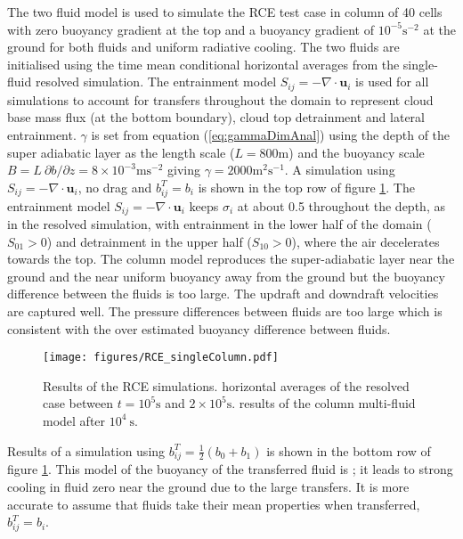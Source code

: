 \documentclass[draft]{agujournal2019}
\begin{document}
The two fluid model is used to simulate the RCE test case in 
column of 40 cells with zero buoyancy gradient at the top and a buoyancy
gradient of $10^{-5}\text{s}^{-2}$ at the ground for both fluids
and uniform radiative cooling. The two fluids are initialised using
the time mean conditional horizontal averages from the single-fluid
resolved simulation. The entrainment model $S_{ij}=-\nabla\cdot\mathbf{u}_{i}$
is used for all simulations to account for transfers throughout the
domain to represent cloud base mass flux (at the bottom boundary),
cloud top detrainment and lateral entrainment. $\gamma$ is set from
equation (\ref{eq:gammaDimAnal}) using the depth of the super adiabatic
layer as the length scale ($L=800\text{m}$) and the buoyancy scale
$B=L\ \partial b/\partial z=8\times10^{-3}\text{m}\text{s}^{-2}$
giving $\gamma=2000\text{m}^{2}\text{s}^{-1}$. A simulation using
$S_{ij}=-\nabla\cdot\mathbf{u}_{i}$, no drag and $b_{ij}^{T}=b_{i}$
is shown in the top row of figure \ref{fig:RCE_singleColumn}.
The entrainment model $S_{ij}=-\nabla\cdot\mathbf{u}_{i}$ keeps $\sigma_{i}$
at about 0.5 throughout the depth, as in the resolved simulation,
with entrainment in the lower half of the domain ($S_{01}>0$) and
detrainment in the upper half ($S_{10}>0$), where the air decelerates
towards the top. The  column model reproduces the super-adiabatic
layer near the ground and the near uniform buoyancy away from the
ground but the buoyancy difference between the fluids is too large.
The updraft and downdraft velocities are captured well. The pressure
differences between fluids are too large which is consistent with
the over estimated buoyancy difference between fluids. 

\begin{figure}
\noindent
\texttt{[image: figures/RCE\_singleColumn.pdf]}
\caption{\label{fig:RCE_singleColumn}
Results of the RCE simulations. \protect{} horizontal averages
of the resolved case between $t=10^{5}\text{s}$ and $2\times10^{5}\text{s}$. \protect{} results of the  column multi-fluid model after $10^{4}\ \text{s}$. }
\end{figure}

Results of a simulation using $b_{ij}^{T}=\frac{1}{2}(b_{0}+b_{1})$
is shown in the bottom row of figure \ref{fig:RCE_singleColumn}.
This model of the buoyancy of the transferred fluid is ; it leads
to strong cooling in fluid zero near the ground due to the large transfers.
It is more accurate to assume that fluids take their mean properties
when transferred, $b_{ij}^{T}=b_{i}$. 
\end{document}
